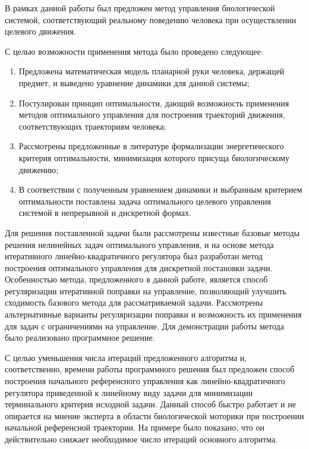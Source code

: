\documentclass[../doc.tex]{subfiles}
\begin{document}
    В рамках данной работы был предложен метод управления биологической системой,
    соответствующий реальному поведению человека при осуществлении целевого движения.

    С целью возможности применения метода было проведено следующее:
    \begin{enumerate}\itemsep0em
        \item Предложена математическая модель планарной руки человека, держащей предмет,
            и выведено уравнение динамики для данной системы;
        \item Постулирован принцип оптимальности, дающий возможность применения методов
            оптимального управления для построения траекторий движения, соответствующих
            траекториям человека;
        \item Рассмотрены предложенные в литературе формализации энергетического критерия оптимальности, минимизация которого присуща биологическому движению;
        \item В соответствии с полученным уравнением динамики и выбранным критерием оптимальности поставлена задача оптимального целевого управления системой в непрерывной и дискретной формах.
    \end{enumerate}
    
    Для решения поставленной задачи были рассмотрены известные базовые методы решения нелинейных
        задач оптимального управления, и на основе метода итеративного линейно-квадратичного регулятора
        был разработан метод построения оптимального управления для дискретной постановки задачи.
    Особенностью метода, предложенного в данной работе, является способ регуляризации итеративной поправки на управление,
        позволяющий улучшить сходимость базового метода для рассматриваемой задачи.
    Рассмотрены альтернативные варианты регуляризации поправки и возможность их применения для задач
        с ограничениями на управление.
    Для демонстрации работы метода было реализовано программное решение.

    С целью уменьшения числа итераций предложенного алгоритма и, соответственно, времени работы
        программного решения был предложен способ построения начального референсного управления как
        линейно-квадратичного регулятора приведенной к линейному виду задачи для минимизации терминального
        критерия исходной задачи.
    Данный способ быстро работает и не опирается на мнение эксперта в области биологической моторики при построении начальной референсной траектории.
    На примере было показано, что он действительно снижает необходимое число итераций основного алгоритма.
    
\end{document}

